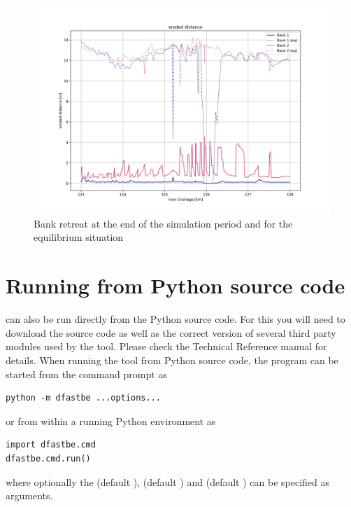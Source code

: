 \begin{figure}
\includegraphics[width=\textwidth]{figures/11_erodis.png}
\caption{Bank retreat at the end of the simulation period and for the equilibrium situation}
\label{Fig2.13}
\end{figure}



\clearpage
\section{Running from Python source code} \label{Sec:Python}
\dfastbe can also be run directly from the Python source code.
For this you will need to download the source code as well as the correct version of several third party modules used by the tool.
Please check the \dfastbe Technical Reference manual for details.
When running the tool from Python source code, the program can be started from the command prompt as

\begin{Verbatim}
python -m dfastbe ...options...
\end{Verbatim}

or from within a running Python environment as

\begin{Verbatim}
import dfastbe.cmd
dfastbe.cmd.run()
\end{Verbatim}

where optionally the  (default ),  (default ) and  (default ) can be specified as arguments.